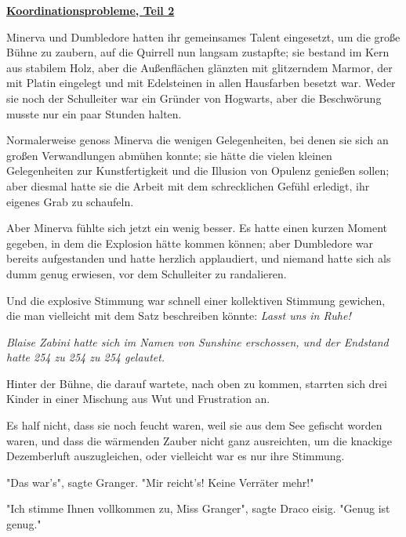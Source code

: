 

\hypertarget{koordinationsprobleme-teil-2}{%

\textbf{\uline{Koordinationsprobleme, Teil 2}}

Minerva und Dumbledore hatten ihr gemeinsames Talent eingesetzt, um die große Bühne zu zaubern, auf die Quirrell nun langsam zustapfte; sie bestand im Kern aus stabilem Holz, aber die Außenflächen glänzten mit glitzerndem Marmor, der mit Platin eingelegt und mit Edelsteinen in allen Hausfarben besetzt war. Weder sie noch der Schulleiter war ein Gründer von Hogwarts, aber die Beschwörung musste nur ein paar Stunden halten.

Normalerweise genoss Minerva die wenigen Gelegenheiten, bei denen sie sich an großen Verwandlungen abmühen konnte; sie hätte die vielen kleinen Gelegenheiten zur Kunstfertigkeit und die Illusion von Opulenz genießen sollen; aber diesmal hatte sie die Arbeit mit dem schrecklichen Gefühl erledigt, ihr eigenes Grab zu schaufeln.

Aber Minerva fühlte sich jetzt ein wenig besser. Es hatte einen kurzen Moment gegeben, in dem die Explosion hätte kommen können; aber Dumbledore war bereits aufgestanden und hatte herzlich applaudiert, und niemand hatte sich als dumm genug erwiesen, vor dem Schulleiter zu randalieren.

Und die explosive Stimmung war schnell einer kollektiven Stimmung gewichen, die man vielleicht mit dem Satz beschreiben könnte: \emph{Lasst uns in Ruhe!}

\emph{Blaise Zabini hatte sich im Namen von Sunshine erschossen, und der Endstand hatte 254 zu 254 zu 254 gelautet.}

Hinter der Bühne, die darauf wartete, nach oben zu kommen, starrten sich drei Kinder in einer Mischung aus Wut und Frustration an.

Es half nicht, dass sie noch feucht waren, weil sie aus dem See gefischt worden waren, und dass die wärmenden Zauber nicht ganz ausreichten, um die knackige Dezemberluft auszugleichen, oder vielleicht war es nur ihre Stimmung.

"Das war's", sagte Granger. "Mir reicht's! Keine Verräter mehr!"

"Ich stimme Ihnen vollkommen zu, Miss Granger", sagte Draco eisig. "Genug ist genug."

}

